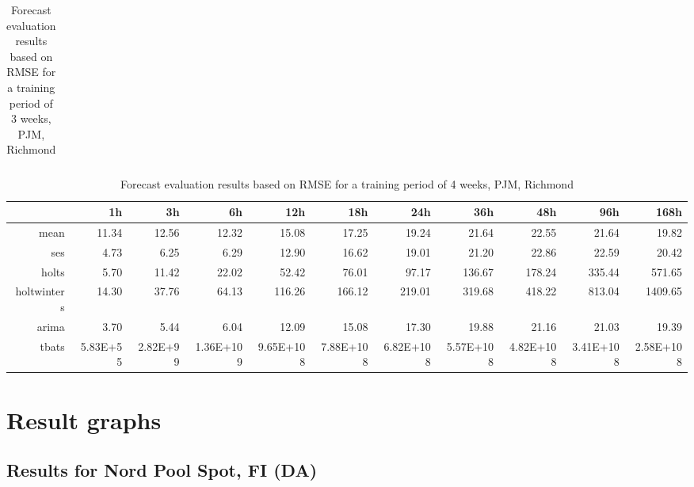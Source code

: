 \begin{landscape}
\begin{table}[ht]
\begin{tabular}{rrrrrrrrrrr}
   \hline
\end{tabular}
\caption{Forecast evaluation results based on RMSE for a training period of 3 weeks, PJM, Richmond}
\label{tab:app_results_richmond_3weeks}
\end{table}
\begin{table}[ht]
\centering
\begin{tabular}{rrrrrrrrrrr}
  \hline
 & 1h & 3h & 6h & 12h & 18h & 24h & 36h & 48h & 96h & 168h \\ 
  \hline
mean & 11.34 & 12.56 & 12.32 & 15.08 & 17.25 & 19.24 & 21.64 & 22.55 & 21.64 & 19.82 \\ 
  ses & 4.73 & 6.25 & 6.29 & 12.90 & 16.62 & 19.01 & 21.20 & 22.86 & 22.59 & 20.42 \\ 
  holts & 5.70 & 11.42 & 22.02 & 52.42 & 76.01 & 97.17 & 136.67 & 178.24 & 335.44 & 571.65 \\ 
  holtwinters & 14.30 & 37.76 & 64.13 & 116.26 & 166.12 & 219.01 & 319.68 & 418.22 & 813.04 & 1409.65 \\ 
  arima & 3.70 & 5.44 & 6.04 & 12.09 & 15.08 & 17.30 & 19.88 & 21.16 & 21.03 & 19.39 \\ 
  tbats & 5.83E+55 & 2.82E+99 & 1.36E+109 & 9.65E+108 & 7.88E+108 & 6.82E+108 & 5.57E+108 & 4.82E+108 & 3.41E+108 & 2.58E+108 \\ 
   \hline
\end{tabular}
\caption{Forecast evaluation results based on RMSE for a training period of 4 weeks, PJM, Richmond}
\label{tab:app_results_richmond_4weeks}
\vspace*{-0.4in}
\end{table}

\end{landscape}






\section{Result graphs} \label{sec:app_result_graphs}

\FloatBarrier
\subsection{Results for Nord Pool Spot, FI (DA)} \label{ssec:app_graphs_nord_pool_spot}


